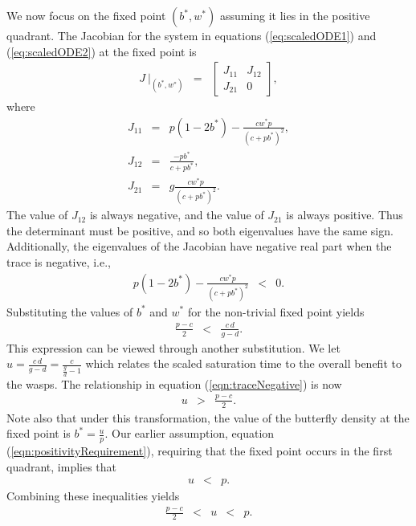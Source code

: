 \documentclass[review,authoryear]{elsarticle}
\begin{document}
We now focus on the fixed point $(b^*,w^*)$ assuming it lies in the positive quadrant.
The Jacobian for the system in equations (\ref{eq:scaledODE1}) and
(\ref{eq:scaledODE2}) at the fixed point is
\begin{eqnarray}
  J ~ \bigg|_{(b^*,w^*)} & = &
          \left[
          \begin{array}{rr}
            J_{11} & J_{12} \\
            J_{21} & 0
          \end{array}
          \right],
\end{eqnarray}
where
\begin{eqnarray}
  \label{eq:jacobian}
  J_{11} & = & p (1-2b^*) -  \frac{cw^*p}{(c+p b^*)^2}, \\
  J_{12} & = & \frac{-pb^* }{c+p b^*}, \\
  J_{21} & = &g\frac{ c  w^*  p}{(c+p b^*)^2}.
\end{eqnarray}
The value of $J_{12}$ is always negative, and the value of $J_{21}$ is always positive. Thus the determinant must be positive, and so both eigenvalues have the same sign.
Additionally, the eigenvalues of the Jacobian have negative real part when the
trace is negative, i.e.,
\begin{eqnarray}
  p (1-2b^*) - \frac{cw^*p}{(c+p b^*)^2} & < & 0.
\end{eqnarray}
Substituting the values of $b^*$ and $w^*$ for the non-trivial fixed point
yields
\begin{eqnarray}
  \label{eqn:traceNegative}
  \frac{p-c}{2} & < & \frac{c\,d}{g-d}.
\end{eqnarray}
This expression can be viewed through another substitution. We let
$u=\frac{c\,d}{g-d}=\frac{c}{\frac{g}{d}-1}$ which relates the scaled saturation time to the overall benefit to the wasps.   The relationship in equation
(\ref{eqn:traceNegative}) is now
\begin{eqnarray}
  \label{eq:stabilityParameters}
  u & > & \frac{p-c}{2}.
\end{eqnarray}
Note also that under this transformation, the value of the butterfly
density at the fixed point is $b^* = \frac{u}{p}$. Our earlier assumption, equation (\ref{eqn:positivityRequirement}), requiring that the fixed point occurs in the first quadrant,  implies that
\begin{eqnarray}
  \label{eq:boundFixedPoint}
  u & < & p.
\end{eqnarray}
Combining these inequalities yields
\begin{equation}
  \begin{array}{rcccl}
  \frac{p-c}{2}  & <  & u  & < & p.
  \end{array}
\end{equation}
\end{document}
